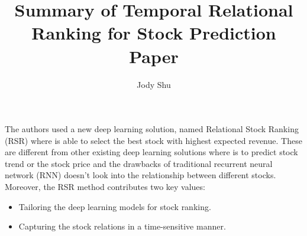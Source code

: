 \documentclass[11pt, oneside]{article}   	%
\title{Summary of Temporal Relational Ranking for Stock Prediction Paper }
\author{Jody Shu}
\begin{document}
\begin{Large}
\maketitle
The authors used a new deep learning solution, named Relational Stock Ranking (RSR) where is able to select the best stock with highest expected revenue.  These are different from other existing deep learning solutions where is to predict stock trend or the stock price and the drawbacks of traditional recurrent neural network (RNN) doesn't look into the relationship between different stocks.  Moreover, the RSR method contributes two key values:
\begin{itemize}
\item Tailoring the deep learning models for stock ranking.
\item Capturing the stock relations in a time-sensitive manner.
\end{itemize}


\end{Large}
\end{document}
